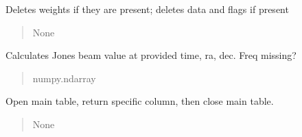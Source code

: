 \documentclass[letterpaper,10pt,english]{sphinxmanual}
\begin{document}
\begin{fulllineitems}
\begin{fulllineitems}
\end{fulllineitems}


\begin{fulllineitems}
\label{\detokenize{api/killMS.Data:killMS.Data.ClassMS.ClassMS.DelData}}
\pysigstartsignatures
{}
\pysigstopsignatures
\sphinxAtStartPar
Deletes weights if they are present; deletes data and flags if present
\begin{quote}\begin{description}
\sphinxAtStartPar
None

\end{description}\end{quote}

\end{fulllineitems}


\begin{fulllineitems}
\label{\detokenize{api/killMS.Data:killMS.Data.ClassMS.ClassMS.GiveBeam}}
\pysigstartsignatures
{}
\pysigstopsignatures
\sphinxAtStartPar
Calculates Jones beam value at provided time, ra, dec. Freq missing?
\begin{quote}\begin{description}
\sphinxAtStartPar
numpy.ndarray

\end{description}\end{quote}

\end{fulllineitems}


\begin{fulllineitems}
\label{\detokenize{api/killMS.Data:killMS.Data.ClassMS.ClassMS.GiveCol}}
\pysigstartsignatures
{}
\pysigstopsignatures
\sphinxAtStartPar
Open main table, return specific column, then close main table.
\begin{quote}\begin{description}
\sphinxAtStartPar
None


\end{description}
\end{quote}
\end{fulllineitems}
\end{fulllineitems}
\end{document}
